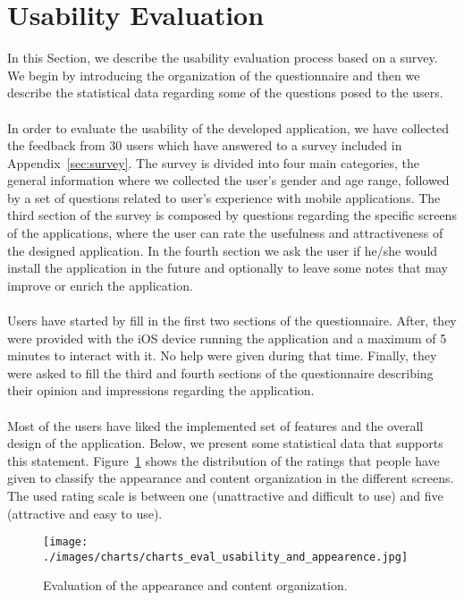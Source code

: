 \section{Usability Evaluation}
\label{subsec:usabilityEvaluation}
In this Section, we describe the usability evaluation process based on a survey. We begin by introducing the organization of the questionnaire and then we describe the statistical data regarding some of the questions posed to the users.\\
\\
In order to evaluate the usability of the developed application, we have collected the feedback from 30 users which have answered to a survey included in Appendix~\ref{sec:survey}. The survey is divided into four main categories, the general information where we collected the user’s gender and age range, followed by a set of questions related to user’s experience with mobile applications. The third section of the survey is composed by questions regarding the specific screens of the applications, where the user can rate the usefulness and attractiveness of the designed application. In the fourth section we ask the user if he/she would install the application in the future and optionally to leave some notes that may improve or enrich the application.\\
\\
Users have started by fill in the first two sections of the questionnaire. After, they were provided with the iOS device running the application and a maximum of 5 minutes to interact with it. No help were given during that time. Finally, they were asked to fill the third and fourth sections of the questionnaire describing their opinion and impressions regarding the application.\\
\\
Most of the users have liked the implemented set of features and the overall design of the application. Below, we present some statistical data that supports this statement. Figure~\ref{fig:usabilityOverall} shows the distribution of the ratings that people have given to classify the appearance and content organization in the different screens. The used rating scale is between one (unattractive and difficult to use) and five (attractive and easy to use).\\
\begin{figure}[h!]
 \centering
   \texttt{[image: ./images/charts/charts\_eval\_usability\_and\_appearence.jpg]}
   \caption{Evaluation of the appearance and content organization.}
   \label{fig:usabilityOverall}
\end{figure}\\
